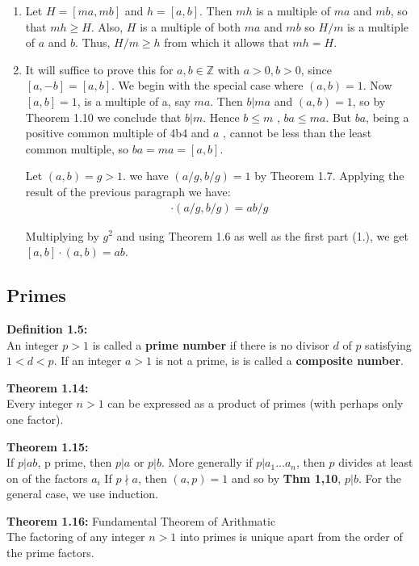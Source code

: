 \documentclass[a4paper]{article}
\begin{document}
\begin{enumerate}
\item Let $H=[ma,mb]$ and $h=[a,b]$. Then $mh$ is a multiple of $ma$ and $mb$, so that $mh\geq H$. Also, $H$ is a multiple of both $ma$ and $mb$ so $H/m$ is a multiple of $a$ and $b$. Thus, $H/m \geq h$ from which it allows that $mh=H$.
\item It will suffice to prove this for $a,b\in\mathbb{Z}$ with $a>0,b>0$, since $[a,-b]=[a,b]$. We begin with the special case where $(a,b)=1$. Now $[a,b]=1$, is a multiple of a, say $ma$. Then $b|ma$ and $(a,b)=1$, so by Theorem 1.10 we conclude that $b|m$. Hence $b \leq m$ , $ba\leq ma$. But $ba$, being a positive common multiple of 4b4 and $a$ , cannot be less than the least common multiple, so $ba=ma=[a,b]$.

Let $(a,b)=g>1$. we have $(a/g,b/g)=1$ by Theorem 1.7. Applying the result of the previous paragraph we have:
\begin{align}
[a/g,b/g]\cdot(a/g,b/g)=ab/g
\end{align}

Multiplying by $g^2$ and using Theorem 1.6 as well as the first part (1.), we get $[a,b]\cdot(a,b)=ab$.
\end{enumerate}


\subsection{Primes}

\textbf{Definition 1.5:}\\
An integer $p>1$ is called a \textbf{prime number} if there is no divisor $d$ of $p$ satisfying $1<d<p$. If an integer $a>1$ is not a prime, is is called a \textbf{composite number}.

\textbf{Theorem 1.14:}\\
Every integer $n>1$ can be expressed as a product of primes (with perhaps only one factor).


\textbf{Theorem 1.15:}\\
If $p|ab$, p prime, then $p|a$ or $p|b$. More generally if $p|a_1...a_n$, then $p$ divides at least on of the factors $a_i$ If $p\nmid a$, then $(a,p)=1$ and so by \textbf{Thm 1,10}, $p|b$. For the general case, we use induction.

\textbf{Theorem 1.16:} Fundamental Theorem of Arithmatic\\
The factoring of any integer $n>1$ into primes is unique apart from the order of the prime factors.
\end{document}
